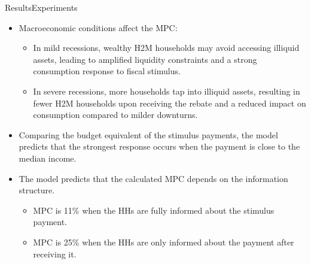 \documentclass{beamer}
\begin{document}
\begin{frame}{Results}{Experiments \citep{kaplan2014model}}
	\begin{itemize}
		\item<1-> Macroeconomic conditions affect the MPC:
		\begin{itemize}
			\footnotesize
			\item<1-> In mild recessions, wealthy H2M households may avoid accessing illiquid assets, leading to amplified liquidity constraints and a strong consumption response to fiscal stimulus.

			\item<1-> In severe recessions, more households tap into illiquid assets, resulting in fewer H2M households upon receiving the rebate and a reduced impact on consumption compared to milder downturns.
		\end{itemize}
		\item<2-> Comparing the budget equivalent of the stimulus payments, the model predicts that the strongest response occurs when the payment is close to the median income.
		\item <3-> The model predicts that the calculated MPC depends on the information structure.
		\begin{itemize}
			\footnotesize
			\item<3-> MPC is 11\% when the HHs are fully informed about the stimulus payment.
			\item <3-> MPC is 25\% when the HHs are only informed about the payment after receiving it.
		\end{itemize}
	\end{itemize}
	
\end{frame}
\end{document}
